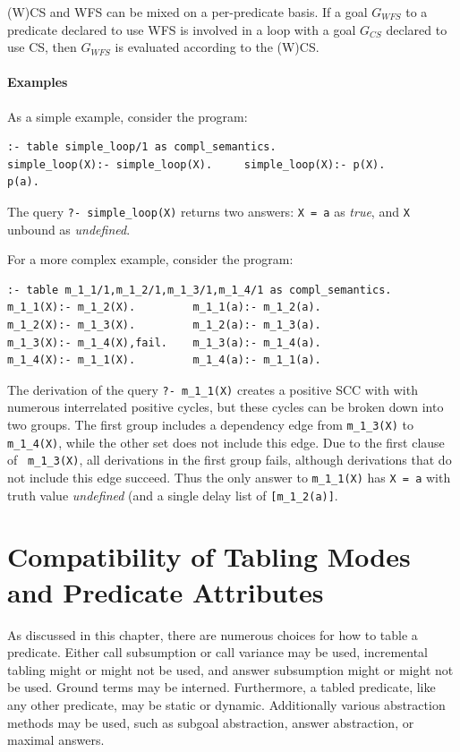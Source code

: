 (W)CS and WFS can be mixed on a per-predicate basis.  If a goal
$G_{WFS}$ to a predicate declared to use WFS is involved in a loop
with a goal $G_{CS}$ declared to use CS, then $G_{WFS}$ is evaluated
according to the (W)CS.

\paragraph{Examples}

As a simple example, consider the program:
\begin{verbatim}
:- table simple_loop/1 as compl_semantics.
simple_loop(X):- simple_loop(X).     simple_loop(X):- p(X).
p(a).
\end{verbatim}
The query {\tt ?- simple\_loop(X)} returns two answers: {\tt X = a} as
{\em true}, and {\tt X} unbound as {\em undefined}.

For a more complex example, consider the program:
\begin{verbatim}
:- table m_1_1/1,m_1_2/1,m_1_3/1,m_1_4/1 as compl_semantics.
m_1_1(X):- m_1_2(X).         m_1_1(a):- m_1_2(a).
m_1_2(X):- m_1_3(X).         m_1_2(a):- m_1_3(a).         
m_1_3(X):- m_1_4(X),fail.    m_1_3(a):- m_1_4(a).
m_1_4(X):- m_1_1(X).         m_1_4(a):- m_1_1(a).
\end{verbatim}
%
The derivation of the query {\tt ?- m\_1\_1(X)} creates a positive SCC
with with numerous interrelated positive cycles, but these cycles can
be broken down into two groups.  The first group includes a dependency
edge from {\tt m\_1\_3(X)} to {\tt m\_1\_4(X)}, while the other set
does not include this edge.  Due to the first clause of {\tt
  m\_1\_3(X)}, all derivations in the first group fails, although
derivations that do not include this edge succeed.  Thus the only
answer to {\tt m\_1\_1(X)} has {\tt X = a} with truth value {\em
  undefined} (and a single delay list of {\tt [m\_1\_2(a)]}.



\section{Compatibility of Tabling Modes and Predicate Attributes} \label{sec:tabling-compatibility}
%
As discussed in this chapter, there are numerous choices for how to
table a predicate. Either call subsumption or call variance may be
used, incremental tabling might or might not be used, and answer
subsumption might or might not be used.  Ground terms may be interned.
Furthermore, a tabled predicate, like any other predicate, may be
static or dynamic.
Additionally various abstraction methods may be used, such as subgoal
abstraction, answer abstraction, or maximal answers.

